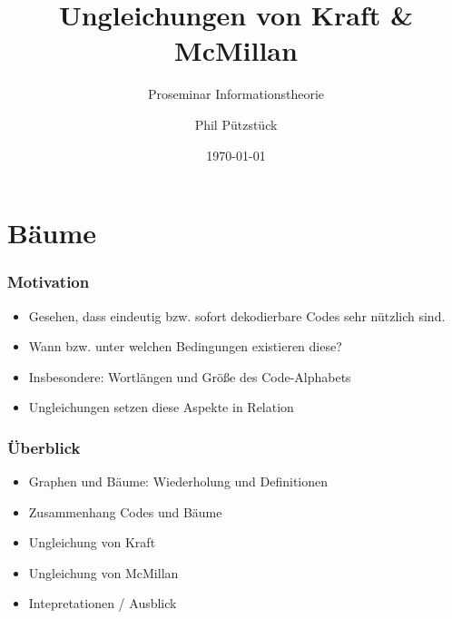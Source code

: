 \documentclass{beamer}
\title{Ungleichungen von Kraft \& McMillan}
\subtitle{Proseminar Informationstheorie}
\author{Phil Pützstück}
\date{\today}
\begin{document}
\maketitle

\section{Bäume}
\begin{frame}
    \frametitle{Motivation}
    \begin{itemize}
        \setlength\itemsep{1em}
        \item Gesehen, dass eindeutig bzw. sofort dekodierbare Codes sehr nützlich sind.
        \item Wann bzw. unter welchen Bedingungen existieren diese?
        \item Insbesondere: Wortlängen und Größe des Code-Alphabets
        \item Ungleichungen setzen diese Aspekte in Relation
    \end{itemize}
\end{frame}

\begin{frame}
    \frametitle{Überblick}
    \begin{itemize}
        \setlength\itemsep{1em}
        \item Graphen und Bäume: Wiederholung und Definitionen
        \item Zusammenhang Codes und Bäume
        \item Ungleichung von Kraft
        \item Ungleichung von McMillan
        \item Intepretationen / Ausblick
    \end{itemize}
\end{frame}
\end{document}
